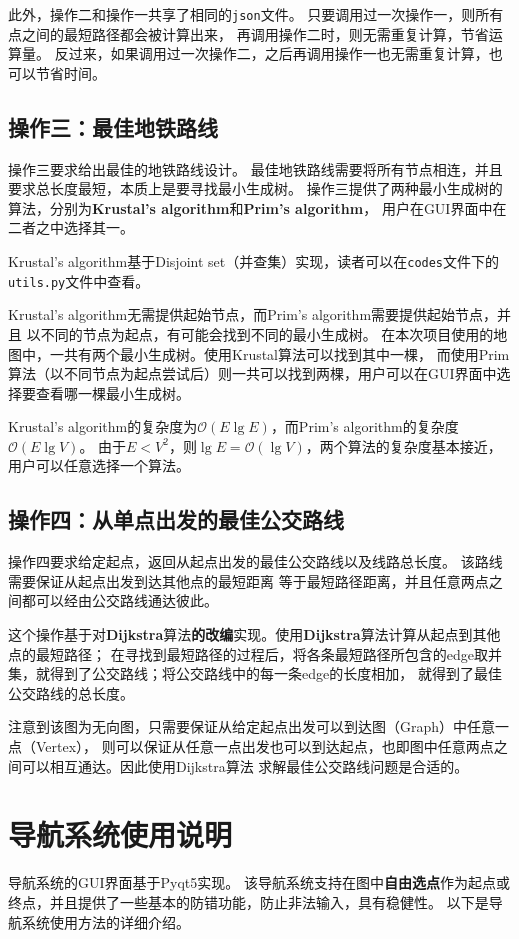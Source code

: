 \documentclass{article}
\begin{document}
此外，操作二和操作一共享了相同的\texttt{json}文件。
只要调用过一次操作一，则所有点之间的最短路径都会被计算出来，
再调用操作二时，则无需重复计算，节省运算量。
反过来，如果调用过一次操作二，之后再调用操作一也无需重复计算，也可以节省时间。


\subsection{操作三：最佳地铁路线}
操作三要求给出最佳的地铁路线设计。
最佳地铁路线需要将所有节点相连，并且要求总长度最短，本质上是要寻找最小生成树。
操作三提供了两种最小生成树的算法，分别为\textbf{Krustal's algorithm}和\textbf{Prim's algorithm}，
用户在GUI界面中在二者之中选择其一。

Krustal's algorithm基于Disjoint set（并查集）实现，读者可以在\texttt{codes}文件下的
\texttt{utils.py}文件中查看。

Krustal's algorithm无需提供起始节点，而Prim's algorithm需要提供起始节点，并且
以不同的节点为起点，有可能会找到不同的最小生成树。
在本次项目使用的地图中，一共有两个最小生成树。使用Krustal算法可以找到其中一棵，
而使用Prim算法（以不同节点为起点尝试后）则一共可以找到两棵，用户可以在GUI界面中选择要查看哪一棵最小生成树。

Krustal's algorithm的复杂度为$\mathcal{O}(E\lg E)$，而Prim's algorithm的复杂度$\mathcal{O}(E\lg V)$。
由于$E<V^2$，则$\lg E = \mathcal{O}(\lg V)$，两个算法的复杂度基本接近，用户可以任意选择一个算法。


\subsection{操作四：从单点出发的最佳公交路线}
操作四要求给定起点，返回从起点出发的最佳公交路线以及线路总长度。
该路线需要保证从起点出发到达其他点的最短距离
等于最短路径距离，并且任意两点之间都可以经由公交路线通达彼此。

这个操作基于对\textbf{Dijkstra}算法\textbf{的改编}实现。使用\textbf{Dijkstra}算法计算从起点到其他点的最短路径；
在寻找到最短路径的过程后，将各条最短路径所包含的edge取并集，就得到了公交路线；将公交路线中的每一条edge的长度相加，
就得到了最佳公交路线的总长度。

注意到该图为无向图，只需要保证从给定起点出发可以到达图（Graph）中任意一点（Vertex），
则可以保证从任意一点出发也可以到达起点，也即图中任意两点之间可以相互通达。因此使用Dijkstra算法
求解最佳公交路线问题是合适的。

\section{导航系统使用说明}
导航系统的GUI界面基于Pyqt5实现。
该导航系统支持在图中\textbf{自由选点}作为起点或终点，并且提供了一些基本的防错功能，防止非法输入，具有稳健性。
以下是导航系统使用方法的详细介绍。
\end{document}
